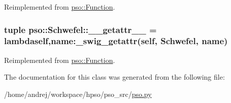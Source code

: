 Reimplemented from \hyperlink{classpso_1_1Function_5bddc07dbaab0ee579488bdcc8103a71}{pso::Function}.\hypertarget{classpso_1_1Schwefel_cd291b909d2a8bef16ce5b17d93c64ec}{
\subsubsection{\setlength{\rightskip}{0pt plus 5cm}tuple {\bf pso::Schwefel::\_\-\_\-getattr\_\-\_\-} = lambdaself,name:\_\-swig\_\-getattr(self, {\bf Schwefel}, name)}}
\label{classpso_1_1Schwefel_cd291b909d2a8bef16ce5b17d93c64ec}




Reimplemented from \hyperlink{classpso_1_1Function_affeed856b337656e88895fa35321496}{pso::Function}.

The documentation for this class was generated from the following file:\begin{CompactItemize}
\item 
/home/andrej/workspace/hpso/pso\_\-src/\hyperlink{pso_8py}{pso.py}\end{CompactItemize}

